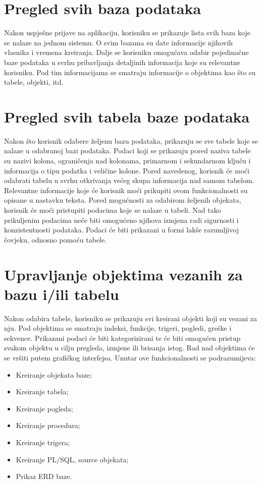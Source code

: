 \documentclass[12pt, a4paper]{report}
\theoremstyle{definition}
\begin{document}
\section{Pregled svih baza podataka}
Nakon uspješne prijave na aplikaciju, korisniku se prikazuje lista svih baza koje se nalaze na jednom sistemu. O svim bazama su date informacije njihovih vlasnika i vremena kreiranja. Dalje se korisniku omogućava odabir pojedinačne baze podataka u svrhu pribavljanja detaljinih informacija koje su relevantne korisniku. Pod tim informacijama se smatraju informacije o objektima kao što su tabele, objekti, itd. 

\section{Pregled svih tabela baze podataka}
Nakon što korisnik odabere željenu bazu podataka, prikazuju se sve tabele koje se nalaze u odabranoj bazi podataka. Podaci koji se prikazuju pored naziva tabele su nazivi kolona, ograničenja nad kolonama, primarnom i sekundarnom ključu i informacija o tipu podatka i veličine kolone. Pored navedenog, korisnik će moći odabrati tabelu u svrhu otkrivanja većeg skupa informacija nad samom tabelom. Relevantne informacije koje će korisnik moći prikupiti ovom funkcionalnosti su opisane u nastavku teksta. 
Pored mogućnosti za odabirom željenih objekata, korisnik će moći pristupiti podacima koje se nalaze u tabeli. Nad tako prikuljenim podacima neće biti omogućeno njihova izmjena radi sigurnosti i konzistentnosti podataka. Podaci će biti prikazani u formi lakše razumljivoj čovjeku, odnosno pomoću tabele.

\section{Upravljanje objektima vezanih za bazu i/ili tabelu}
Nakon odabira tabele, korisniku se prikazuju svi kreirani objekti koji su vezani za nju. Pod objektima se smatraju indeksi, funkcije, trigeri, pogledi, greške i sekvence. Prikazani podaci će biti kategorizirani te će biti omogućen pristup  svakom objektu u cilju pregleda, izmjene ili brisanja istog. Rad nad objektima će se vršiti putem grafičkog interfejsa. Unutar ove funkcionalnosti se podrazumijeva:
	\begin{itemize}
		\item Kreiranje objekata baze;		
		\item Kreiranje tabela;
		
		\item Kreiranje pogleda;
		
		\item Kreiranje procedura;
		
		\item Kreiranje  trigera;
		
		\item Kreiranje PL/SQL, source objekata;
		
		\item Prikaz ERD baze.
	\end{itemize}
\end{document}
